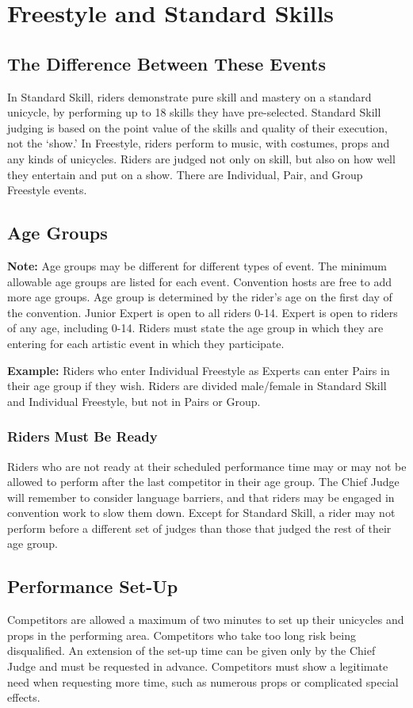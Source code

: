 \chapter{Freestyle and Standard Skills \label{chap:freestyle}}

\section{The Difference Between These Events}
In Standard Skill, riders demonstrate pure skill and mastery on a standard unicycle, by performing up to 18 skills they have pre-selected.
Standard Skill judging is based on the point value of the skills and quality of their execution, not the ‘show.' In Freestyle, riders perform to music, with costumes, props and any kinds of unicycles.
Riders are judged not only on skill, but also on how well they entertain and put on a show.
There are Individual, Pair, and Group Freestyle events.

\section{Age Groups}
\textbf{Note:} Age groups may be different for different types of event.
The minimum allowable age groups are listed for each event.
Convention hosts are free to add more age groups.
Age group is determined by the rider's age on the first day of the convention.
Junior Expert is open to all riders 0-14.
Expert is open to riders of any age, including 0-14.
Riders must state the age group in which they are entering for each artistic event in which they participate.

\textbf{Example:} Riders who enter Individual Freestyle as Experts can enter Pairs in their age group if they wish.
Riders are divided male/female in Standard Skill and Individual Freestyle, but not in Pairs or Group.

\subsection{Riders Must Be Ready}
Riders who are not ready at their scheduled performance time may or may not be allowed to perform after the last competitor in their age group.
The Chief Judge will remember to consider language barriers, and that riders may be engaged in convention work to slow them down.
Except for Standard Skill, a rider may not perform before a different set of judges than those that judged the rest of their age group.

\section{Performance Set-Up}
Competitors are allowed a maximum of two minutes to set up their unicycles and props in the performing area.
Competitors who take too long risk being disqualified.
An extension of the set-up time can be given only by the Chief Judge and must be requested in advance.
Competitors must show a legitimate need when requesting more time, such as numerous props or complicated special effects.

